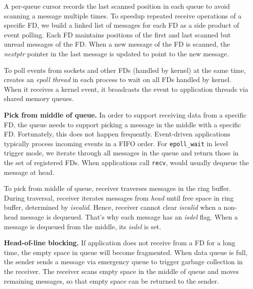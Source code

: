 A per-queue cursor records the last scanned position in each queue to avoid scanning a message multiple times.
To speedup repeated receive operations of a specific FD, we build a linked list of messages for each FD as a side product of event polling.
Each FD maintains positions of the first and last scanned but unread messages of the FD.
When a new message of the FD is scanned, the \emph{nextptr} pointer in the last message is updated to point to the new message.

To poll events from sockets and other FDs (handled by kernel) at the same time, \libipc{} creates an \textit{epoll thread} in each process to wait on all FDs handled by kernel. When it receives a kernel event, it broadcasts the event to application threads via shared memory queues. %

\textbf{Pick from middle of queue.}
In order to support receiving data from a specific FD, the queue needs to support picking a message in the middle with a specific FD.
Fortunately, this does not happen frequently. Event-driven applications typically process incoming events in a FIFO order. For \texttt{epoll\_wait} in level trigger mode, we iterate through all messages in the queue and return those in the set of registered FDs. When applications call \texttt{recv}, \libipc{} would usually dequeue the message at head.

To pick from middle of queue, receiver traverses messages in the ring buffer. During traversal, receiver iterates messages from \textit{head} until free space in ring buffer, determined by \textit{isvalid}. Hence, receiver cannot clear \textit{isvalid} when a non-head message is dequeued. That's why each message has an \textit{isdel} flag. When a message is dequeued from the middle, its \textit{isdel} is set. %

\textbf{Head-of-line blocking.}
If application does not receive from a FD for a long time, the empty space in queue will become fragmented.
When data queue is full, the sender sends a message via emergency queue to trigger garbage collection in the receiver.
The receiver scans empty space in the middle of queue and moves remaining messages, so that empty space can be returned to the sender.

